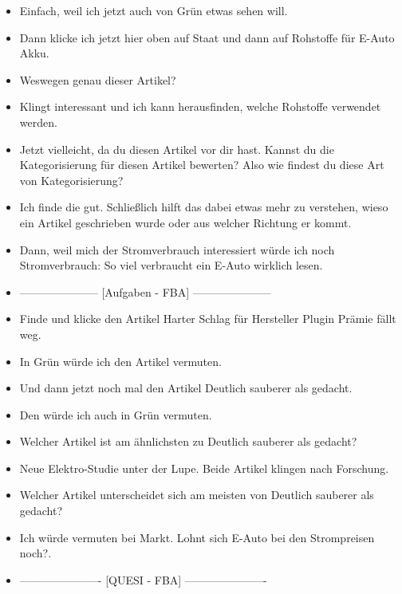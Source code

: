 {\begin{itemize}[]
        \item {} Einfach, weil ich jetzt auch von Grün etwas sehen will.
        \item {} Dann klicke ich jetzt hier oben auf Staat und dann auf \flqq Rohstoffe für E-Auto Akku\frqq{}.
        \item {} Weswegen genau dieser Artikel?
        \item {} Klingt interessant und ich kann herausfinden, welche Rohstoffe verwendet werden.
        \item {} Jetzt vielleicht, da du diesen Artikel vor dir hast.
              Kannst du die Kategorisierung für diesen Artikel bewerten?
              Also wie findest du diese Art von Kategorisierung?
        \item {} Ich finde die gut.
              Schließlich hilft das dabei etwas mehr zu verstehen, wieso ein Artikel geschrieben wurde oder aus welcher Richtung er kommt.
        \item {} Dann, weil mich der Stromverbrauch interessiert würde ich noch \flqq Stromverbrauch: So viel verbraucht ein E-Auto wirklich\frqq{} lesen.
        \item {---------------------} [Aufgaben - FBA] {---------------------}
        \item {} Finde und klicke den Artikel \flqq Harter Schlag für Hersteller Plugin Prämie fällt weg\frqq{}.
        \item {} In Grün würde ich den Artikel vermuten.
        \item {} Und dann jetzt noch mal den Artikel \flqq Deutlich sauberer als gedacht\frqq{}.
        \item {} Den würde ich auch in Grün vermuten.
        \item {} Welcher Artikel ist am ähnlichsten zu \flqq Deutlich sauberer als gedacht\frqq{}?
        \item {} \flqq Neue Elektro-Studie unter der Lupe\frqq{}. Beide Artikel klingen nach Forschung.
        \item {} Welcher Artikel unterscheidet sich am meisten von \flqq Deutlich sauberer als gedacht\frqq{}?
        \item {} Ich würde vermuten bei Markt. \flqq Lohnt sich E-Auto bei den Strompreisen noch?\frqq{}.
        \item {----------------------} [QUESI - FBA] {----------------------}

\end{itemize}}
